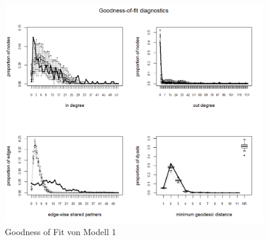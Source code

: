 \documentclass[a4paper,ngerman,oneside,titlepage,bibliography=totoc,11pt]{scrreprt}
\begin{document}
\begin{figure}[ht]
	\centering
		\includegraphics[width=1\textwidth]{../ERGM/GOF3.png}
	\caption{Goodness of Fit von Modell 1}
	\label{fig:gof.model1}
\end{figure}





\newpage









\newpage
\listoffigures
\newpage
\listoftables
\end{document}
